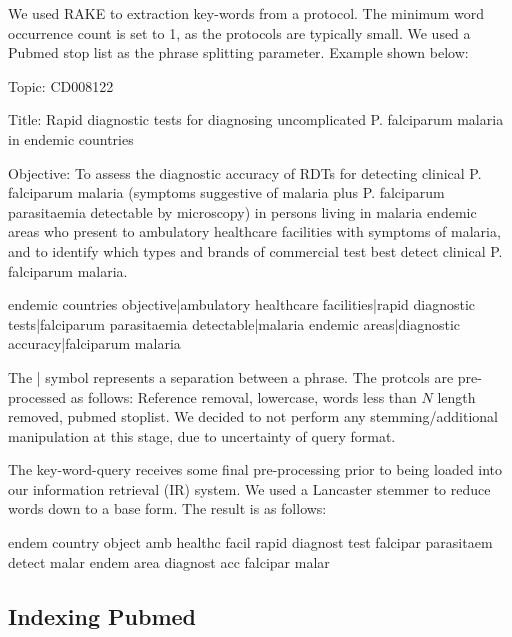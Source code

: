 We used RAKE \cite{rake} to extraction key-words from a protocol. The minimum word occurrence count is set to 1, as the protocols are typically small. We used a Pubmed stop list as the phrase splitting parameter. Example shown below:

\begin{tcolorbox}

Topic: CD008122 

Title: Rapid diagnostic tests for diagnosing uncomplicated P. falciparum malaria in endemic countries 

Objective: To assess the diagnostic accuracy of RDTs for detecting clinical P. falciparum malaria (symptoms suggestive of malaria plus P. falciparum parasitaemia detectable by microscopy) in persons living in malaria endemic areas who present to ambulatory healthcare facilities with symptoms of malaria, and to identify which types and brands of commercial test best detect clinical P. falciparum malaria.

\end{tcolorbox}

 
 
\begin{tcolorbox}

endemic countries objective|ambulatory healthcare facilities|rapid diagnostic tests|falciparum parasitaemia detectable|malaria endemic areas|diagnostic accuracy|falciparum malaria

\end{tcolorbox}

The | symbol represents a separation between a phrase. The protcols are pre-processed as follows: Reference removal, lowercase, words less than $N$ length removed, pubmed stoplist. We decided to not perform any stemming/additional manipulation at this stage, due to uncertainty of query format.

The key-word-query receives some final pre-processing prior to being loaded into our information retrieval (IR) system. We used a Lancaster stemmer to reduce words down to a base form. The result is as follows:

\begin{tcolorbox}

endem country object amb healthc facil rapid diagnost test falcipar parasitaem detect malar endem area diagnost acc falcipar malar

\end{tcolorbox}

\subsection{Indexing Pubmed}

